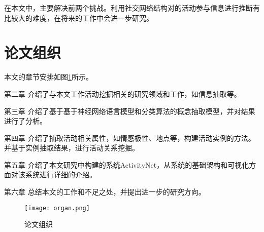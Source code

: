 在本文中，主要解决前两个挑战。利用社交网络结构对的活动参与信息进行推断有比较大的难度，在将来的工作中会进一步研究。

\section{论文组织}
本文的章节安排如图\ref{fig:organ}所示。

{\heiti 第二章} 介绍了与本文工作活动挖掘相关的研究领域和工作，如信息抽取等。

{\heiti 第三章} 介绍了基于基于神经网络语言模型和分类算法的概念抽取模型，并对结果进行了分析。

{\heiti 第四章} 介绍了抽取活动相关属性，如情感极性、地点等，构建活动实例的方法。并基于实例抽取结果，进行活动关系挖掘。

{\heiti 第五章} 介绍了本文研究中构建的系统ActivityNet，从系统的基础架构和可视化方面对该系统进行详细的介绍。

{\heiti 第六章} 总结本文的工作和不足之处，并提出进一步的研究方向。

\begin{figure}[!h]
\caption{论文组织}
\label{fig:organ}
\begin{center}
\texttt{[image: organ.png]}
\end{center}
\end{figure}

